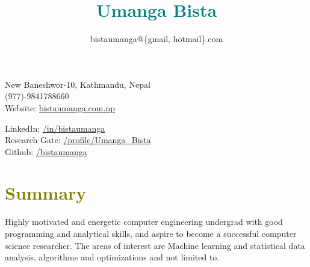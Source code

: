 \documentclass[10pt]{article}
\title{\bfseries\Huge \textcolor{teal}{Umanga Bista}}
\author{bistaumanga@\{gmail, hotmail\}.com}
\begin{document}
\nobibliography*
\maketitle
\vspace{0.5em}
\begin{minipage}[ht]{0.5\textwidth}
New Baneshwor-10, Kathmandu, Nepal\\
(977)-9841788660\\
Website: \href{www.bistaumanga.com.np}{bistaumanga.com.np}
\end{minipage}
\begin{minipage}[ht]{0.48\textwidth}
LinkedIn: \href{https://np.linkedin.com/in/bistaumanga}{/in/bistaumanga}\\
Research Gate: \href{https://www.researchgate.net/profile/Umanga_Bista}{/profile/Umanga\_Bista}\\
Github: \href{https://www.github.com/bistaumanga}{/bistaumanga}\\
\end{minipage}
 
\section*{\textcolor{olive}{Summary}}
Highly motivated and energetic computer engineering undergrad with good programming and analytical skills, and aspire to become a successful computer science researcher. The areas of interest are Machine learning and statistical data analysis, algorithms and optimizations and not limited to.
\end{document}
